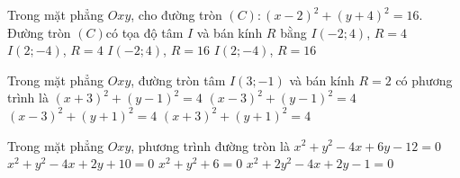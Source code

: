 \begin{ex}%
Trong mặt phẳng $Oxy$, cho đường tròn $(C)\colon{\left(x-2\right)^2}+\left(y+4\right)^2=16$. Đường tròn $(C)$có tọa độ tâm $ I$ và bán kính $ R$ bằng
\choice
{$ I\left(-2;4\right)$, $R=4$}
{\True $ I\left(2;-4\right)$, $R=4$}
{$ I\left(-2;4\right)$, $R=16$}
{$ I\left(2;-4\right)$, $R=16$}
\loigiai{}
\end{ex}

\begin{ex}%
Trong mặt phẳng $Oxy$, đường tròn tâm $I(3;-1)$ và bán kính $R=2$ có phương trình là
\choice
{$(x+3)^2+(y-1)^2=4$}
{$(x-3)^2+(y-1)^2=4$}
{\True $(x-3)^2+(y+1)^2=4$}
{$(x+3)^2+(y+1)^2=4$}
\end{ex}

\begin{ex}%
Trong mặt phẳng $Oxy$, phương trình đường tròn là
\choice
{\True $x^2+y^2-4x+6y-12=0$}
{$x^2+y^2-4x+2y+10=0$}
{$x^2+y^2+6=0$}
{$x^2+2y^2-4x+2y-1=0$}
\end{ex}

